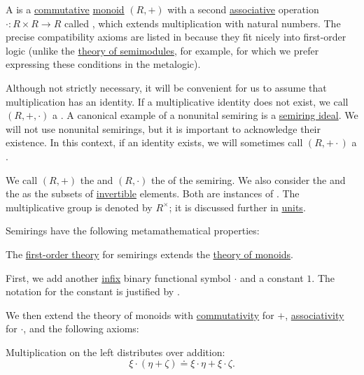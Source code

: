 \begin{definition}\label{def:semiring}
  A  is a \hyperref[def:magma/commutative]{commutative} \hyperref[def:monoid]{monoid} \( (R, +) \) with a second \hyperref[def:magma/associative]{associative} operation \( \cdot: R \times R \to R \) called , which extends multiplication with natural numbers. The precise compatibility axioms are listed in  because they fit nicely into first-order logic (unlike the \hyperref[def:semimodule/theory]{theory of semimodules}, for example, for which we prefer expressing these conditions in the metalogic).

  Although not strictly necessary, it will be convenient for us to assume that multiplication has an identity. If a multiplicative identity does not exist, we call \( (R, +, \cdot) \) a . A canonical example of a nonunital semiring is a \hyperref[def:semiring_ideal]{semiring ideal}. We will not use nonunital semirings, but it is important to acknowledge their existence. In this context, if an identity exists, we will sometimes call \( (R, + \cdot) \) a .

  We call \( (R, +) \) the  and \( (R, \cdot) \) the  of the semiring. We also consider the  and the  as the subsets of \hyperref[def:monoid_inverse]{invertible} elements. Both are instances of . The multiplicative group is denoted by \( R^\times \); it is discussed further in \hyperref[def:divisibility/unit]{units}.

  Semirings have the following metamathematical properties:
  \begin{thmenum}
     The \hyperref[def:first_order_theory]{first-order theory} for semirings extends the \hyperref[def:monoid/theory]{theory of monoids}.

    First, we add another \hyperref[rem:first_order_formula_conventions/infix]{infix} binary functional symbol \( \cdot \) and a constant \( 1 \). The notation for the constant is justified by .

    We then extend the theory of monoids with \hyperref[def:magma/commutative]{commutativity} for \( + \), \hyperref[def:magma/associative]{associativity} for \( \cdot \), and the following axioms:
    \begin{thmenum}
       Multiplication on the left distributes over addition:
      \begin{equation}\label{eq:def:semiring/left_distributivity}
        \xi \cdot (\eta + \zeta) \doteq \xi \cdot \eta + \xi \cdot \zeta.
      \end{equation}


\end{thmenum}
\end{thmenum}
\end{definition}
